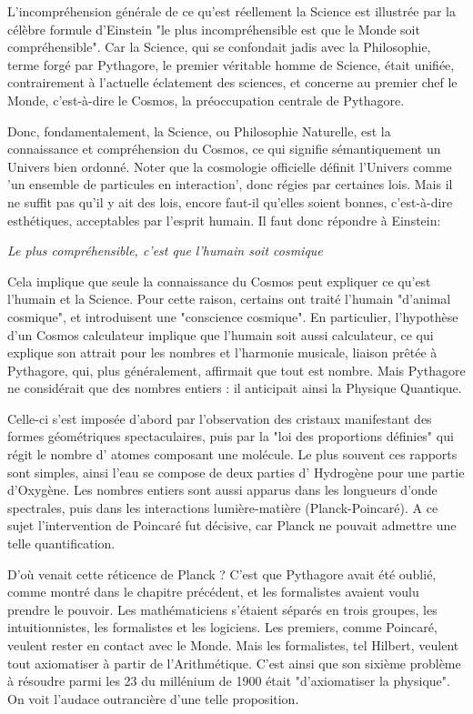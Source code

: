 \documentclass[a4paper,12pt]{article}
\begin{document}
L'incompréhension générale de ce qu'est réellement la Science est illustrée par la célèbre formule d'Einstein "le plus incompréhensible est que le Monde soit compréhensible". Car la Science, qui se confondait jadis avec la Philosophie, terme forgé par Pythagore, le premier véritable homme de Science,  était unifiée, contrairement à l'actuelle éclatement des sciences, et concerne au premier chef le Monde, c'est-à-dire le Cosmos, la préoccupation centrale de Pythagore.

Donc, fondamentalement, la Science, ou Philosophie Naturelle, est la connaissance et compréhension du Cosmos, ce qui signifie sémantiquement un Univers bien ordonné. Noter que la cosmologie officielle définit l'Univers comme 'un ensemble de particules en interaction', donc régies par certaines lois. Mais il ne suffit pas qu'il y ait des lois, encore faut-il qu'elles soient bonnes, c'est-à-dire esthétiques,  acceptables par l'esprit humain. Il faut donc répondre à Einstein:

\textit {Le plus compréhensible, c'est que l'humain soit cosmique}

Cela implique que seule la connaissance du Cosmos peut expliquer ce qu'est l'humain et la Science. Pour cette raison, certains ont traité l'humain "d'animal cosmique", et introduisent une "conscience cosmique". En particulier, l'hypothèse d'un Cosmos calculateur implique que l'humain soit aussi calculateur, ce qui explique son attrait pour les nombres et l'harmonie musicale, liaison prêtée à Pythagore, qui, plus généralement, affirmait que tout est nombre. Mais Pythagore ne considérait que des nombres entiers : il anticipait ainsi la Physique Quantique.  

Celle-ci s'est imposée d'abord par l'observation des cristaux manifestant des formes géométriques spectaculaires, puis par la "loi des proportions définies" qui régit le nombre d' atomes composant une molécule. Le plus souvent ces rapports sont simples, ainsi l'eau se compose de deux parties d' Hydrogène pour une partie d'Oxygène. Les nombres entiers sont aussi apparus dans les longueurs d'onde spectrales, puis dans les interactions lumière-matière (Planck-Poincaré). A ce sujet l'intervention de Poincaré fut décisive, car Planck ne pouvait admettre une telle quantification.

D'où venait cette réticence de Planck ? C'est que Pythagore avait été oublié, comme montré dans le chapitre précédent, et les formalistes avaient voulu prendre le pouvoir. Les mathématiciens s'étaient séparés en trois groupes, les intuitionnistes, les formalistes et les logiciens. Les premiers, comme Poincaré, veulent rester en contact avec le Monde. Mais les formalistes, tel Hilbert, veulent tout axiomatiser à partir de l'Arithmétique. C'est ainsi que son sixième problème à résoudre parmi les 23 du millénium de 1900 était "d'axiomatiser la physique". On voit l'audace outrancière d'une telle proposition. 
\end{document}
